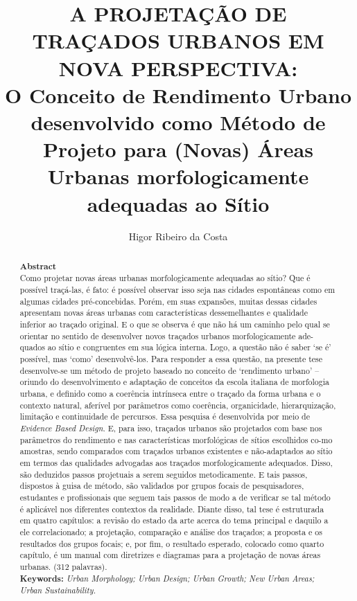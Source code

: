 \documentclass[twoside, 12pt]{book}
\title{A PROJETAÇÃO DE TRAÇADOS URBANOS EM NOVA PERSPECTIVA: \\ \small{O Conceito de Rendimento Urbano desenvolvido como Método de Projeto para (Novas) Áreas Urbanas 
morfologicamente adequadas ao Sítio}}
\author{Higor Ribeiro da Costa}
\begin{document}
    \maketitle
    \setcounter{secnumdepth}{1}

\begin{abstract}
        \textbf{Abstract} \\
Como projetar novas áreas urbanas morfologicamente adequadas ao sítio? Que é possível traçá-las, é fato: é possível observar isso seja nas cidades espontâneas como em algumas cidades pré-concebidas. Porém, em suas expansões, muitas dessas cidades apresentam novas áreas urbanas com características dessemelhantes e qualidade inferior ao traçado original. E o que se observa é que não há um caminho pelo qual se orientar no sentido de desenvolver novos traçados urbanos morfologicamente ade-quados ao sítio e congruentes em sua lógica interna. Logo, a questão não é saber ‘se é’ possível, mas ‘como’ desenvolvê-los.  Para responder a essa questão, na presente tese desenvolve-se um método de projeto baseado no conceito de ‘rendimento urbano’ – oriundo do desenvolvimento e adaptação de conceitos da escola italiana de morfologia urbana, e definido como a coerência intrínseca entre o traçado da forma urbana e o contexto natural, aferível por parâmetros como coerência, organicidade, hierarquização, limitação e continuidade de percursos. Essa pesquisa é desenvolvida por meio de \textit{Evidence Based Design}. E, para isso, traçados urbanos são projetados com base nos parâmetros do rendimento e nas características morfológicas de sítios escolhidos co-mo amostras, sendo comparados com traçados urbanos existentes e não-adaptados ao sítio em termos das qualidades advogadas aos traçados morfologicamente adequados. Disso, são deduzidos passos projetuais a serem seguidos metodicamente. E tais passos, dispostos à guisa de método, são validados por grupos focais de pesquisadores, estudantes e profissionais que seguem tais passos de modo a de verificar se tal método é aplicável nos diferentes contextos da realidade. Diante disso, tal tese é estruturada em quatro capítulos: a revisão do estado da arte acerca do tema principal e daquilo a ele correlacionado; a projetação, comparação e análise dos traçados; a proposta e os resultados dos grupos focais; e, por fim, o resultado esperado, colocado como quarto capítulo, é um manual com diretrizes e diagramas para a projetação de novas áreas urbanas. (312 palavras). \\
\textbf{Keywords:}
\textit{Urban Morphology; Urban Design; Urban Growth; New Urban Areas; Urban Sustainability.} 
\end{abstract}
\end{document}
